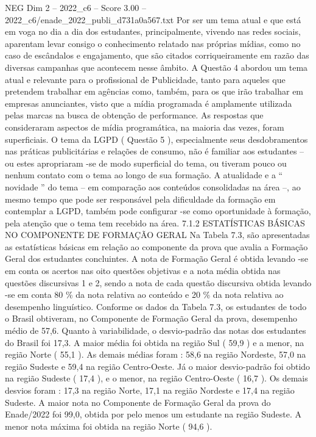 \begin{textsample}{NEG Dim 2 – 2022\_c6 – Score 3.00 – 2022\_c6/enade\_2022\_publi\_d731a0a567.txt}
Por ser um tema atual e que está em voga no dia a dia dos estudantes, principalmente, vivendo nas redes sociais, aparentam levar consigo o conhecimento relatado nas próprias mídias, como no caso de escândalos e engajamento, que são citados corriqueiramente em razão das diversas campanhas que acontecem nesse âmbito.
A Questão 4 abordou um tema atual e relevante para o profissional de Publicidade, tanto para aqueles que pretendem trabalhar em agências como, também, para os que irão trabalhar em empresas anunciantes, visto que a mídia programada é amplamente utilizada pelas marcas na busca de obtenção de performance.
As respostas que consideraram aspectos de mídia programática, na maioria das vezes, foram superficiais.
O tema da LGPD ( Questão 5 ), especialmente seus desdobramentos nas práticas publicitárias e relações de consumo, não é familiar aos estudantes – ou estes apropriaram -se de modo superficial do tema, ou tiveram pouco ou nenhum contato com o tema ao longo de sua formação.
A atualidade e a “ novidade ” do tema – em comparação aos conteúdos consolidadas na área –, ao mesmo tempo que pode ser responsável pela dificuldade da formação em contemplar a LGPD, também pode configurar -se como oportunidade à formação, pela atenção que o tema tem recebido na área. 7.1.2 ESTATÍSTICAS BÁSICAS NO COMPONENTE DE FORMAÇÃO GERAL Na Tabela 7.3, são apresentadas as estatísticas básicas em relação ao componente da prova que avalia a Formação Geral dos estudantes concluintes.
A nota de Formação Geral é obtida levando -se em conta os acertos nas oito questões objetivas e a nota média obtida nas questões discursivas 1 e 2, sendo a nota de cada questão discursiva obtida levando -se em conta 80 \% da nota relativa ao conteúdo e 20 \% da nota relativa ao desempenho linguístico.
Conforme os dados da Tabela 7.3, os estudantes de todo o Brasil obtiveram, no Componente de Formação Geral da prova, desempenho médio de 57,6.
Quanto à variabilidade, o desvio-padrão das notas dos estudantes do Brasil foi 17,3.
A maior média foi obtida na região Sul ( 59,9 ) e a menor, na região Norte ( 55,1 ).
As demais médias foram : 58,6 na região Nordeste, 57,0 na região Sudeste e 59,4 na região Centro-Oeste.
Já o maior desvio-padrão foi obtido na região Sudeste ( 17,4 ), e o menor, na região Centro-Oeste ( 16,7 ).
Os demais desvios foram : 17,3 na região Norte, 17,1 na região Nordeste e 17,4 na região Sudeste.
A maior nota no Componente de Formação Geral da prova do Enade/2022 foi 99,0, obtida por pelo menos um estudante na região Sudeste.
A menor nota máxima foi obtida na região Norte ( 94,6 ).

\end{textsample}
